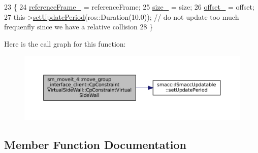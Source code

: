\begin{DoxyCode}
23         \{
24             \hyperlink{classsm__moveit__4_1_1move__group__interface__client_1_1CpConstraintVirtualSideWall_a9eebbc3d7b58367c509ec93eae81b2b0}{referenceFrame\_} = referenceFrame;
25             \hyperlink{classsm__moveit__4_1_1move__group__interface__client_1_1CpConstraintVirtualSideWall_aa460120f216e58206aaec0cf864ad55b}{size\_} = size;
26             \hyperlink{classsm__moveit__4_1_1move__group__interface__client_1_1CpConstraintVirtualSideWall_a5bf697ee83d01d56871552148b4a3004}{offset\_} = offset;
27             this->\hyperlink{classsmacc_1_1ISmaccUpdatable_a88f3b092a81b2d8810a9776c8c69855b}{setUpdatePeriod}(ros::Duration(10.0)); \textcolor{comment}{// do not update too much frequenfly
       since we have a relative collision}
28         \}
\end{DoxyCode}
Here is the call graph for this function\+:
\nopagebreak
\begin{figure}[H]
\begin{center}
\leavevmode
\includegraphics[width=350pt]{classsm__moveit__4_1_1move__group__interface__client_1_1CpConstraintVirtualSideWall_acf1f7b1cb3fa8b0522a8495c7589781a_cgraph}
\end{center}
\end{figure}


\subsection{Member Function Documentation}
\mbox{\label{classsm__moveit__4_1_1move__group__interface__client_1_1CpConstraintVirtualSideWall_a7522d984f70a916e649490dc19fab610}} 
